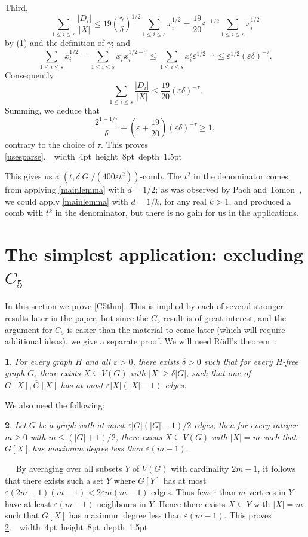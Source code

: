 \documentclass[titlepage,11pt]{article}
\newcommand\blackslug{\hbox{\hskip 1pt \vrule width 4pt height 8pt depth 1.5pt
        \hskip 1pt}}
\newcommand\bbox{\hfill \quad \blackslug \bigbreak}
\newcommand{\vare}{\varepsilon}
\newtheorem{thm}{}[section]
\newcommand{\Proof}{\noindent{\bf Proof.}\ \ }
\begin{document}
Third, 
$$\sum_{1\le i\le s}\frac{|D_i|}{|X|}\le  19 \left(\frac{\gamma}{\delta}\right)^{1/2}\sum_{1\le i\le s}x_i^{1/2}= \frac{19}{20}\vare^{-1/2}\sum_{1\le i\le s}x_i^{1/2}$$ 
by (1) and the definition of $\gamma$; 
and 
$$\sum_{1\le i\le s}x_i^{1/2}=\sum_{1\le i\le s}x_i^{\tau}x_i^{1/2-\tau}\le \sum_{1\le i\le s}x_i^{\tau}\vare^{1/2-\tau}\le 
\vare^{1/2}(\vare\delta)^{-\tau}.$$
Consequently 
$$\sum_{1\le i\le s}\frac{|D_i|}{|X|} \le \frac{19}{20}(\vare\delta)^{-\tau}.$$
Summing, we deduce that 
$$\frac{2^{1-1/\tau}}{\delta}+ \left(\vare+\frac{19}{20}\right)(\vare\delta)^{-\tau}\ge 1,$$
contrary to the choice of $\tau$. This proves \ref{usesparse}.~\bbox


This gives us a $(t,\delta|G|/(400\vare t^2))$-comb. The $t^2$ in the denominator comes from applying \ref{mainlemma} with 
$d=1/2$; as was observed by Pach and Tomon~\cite{pach}, we could apply \ref{mainlemma} with $d=1/k$, for any real $k>1$, and produced a comb with $t^{k}$ in the denominator, 
but there is no gain for us in the applications.


\section{The simplest application: excluding $C_5$}

In this section we prove \ref{C5thm}. This is implied by each of several stronger results later in the paper, 
but since the $C_5$ result is of great interest,
and the argument for $C_5$ is easier than the material to come later (which will require additional ideas), we give a separate proof.
We will need
R\"odl's theorem~\cite{rodl}:
\begin{thm}\label{prerodl}
For every graph $H$ and all $\vare>0$, there exists $\delta>0$ such that for every $H$-free graph $G$, there exists $X\subseteq V(G)$
with $|X|\ge \delta|G|$, such that one of $G[X], \overline{G}[X]$ has  at most $\vare |X|(|X|-1)$ edges.
\end{thm}

We also need the following:
\begin{thm}\label{density}
Let $G$ be a graph with at most $\vare|G|(|G|-1)/2$ edges; then for every integer $m\ge 0$ with $m\le (|G|+1)/2$, there exists
$X\subseteq V(G)$ with $|X|=m$ such that $G[X]$ has maximum degree less than $\vare (m-1)$.
\end{thm}
\Proof
By averaging over all subsets $Y$ of $V(G)$ with cardinality $2m-1$, it follows that there exists such a set $Y$ where $G[Y]$
has at most $\vare(2m-1)(m-1)<2\vare m(m-1)$ edges. Thus fewer than $m$ vertices in $Y$ have at least $\vare (m-1)$ neighbours in $Y$.
Hence there exists $X\subseteq Y$ with $|X|=m$ such that $G[X]$ has maximum degree less than $\vare (m-1)$. This proves \ref{density}.~\bbox
\end{document}

